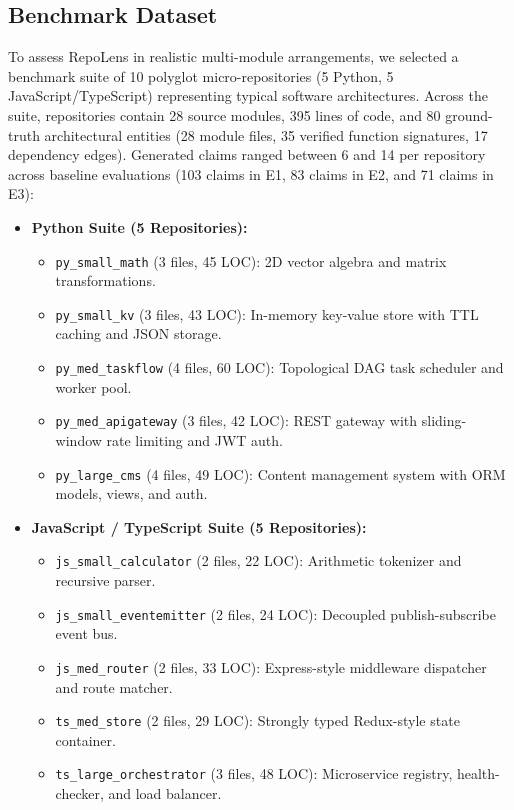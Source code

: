 \documentclass[conference]{IEEEtran}
\begin{document}
\subsection{Benchmark Dataset}
To assess RepoLens in realistic multi-module arrangements, we selected a benchmark suite of 10 polyglot micro-repositories (5 Python, 5 JavaScript/TypeScript) representing typical software architectures. Across the suite, repositories contain 28 source modules, 395 lines of code, and 80 ground-truth architectural entities (28 module files, 35 verified function signatures, 17 dependency edges). Generated claims ranged between 6 and 14 per repository across baseline evaluations (103 claims in E1, 83 claims in E2, and 71 claims in E3):
\begin{itemize}
    \item \textbf{Python Suite (5 Repositories):}
    \begin{itemize}
        \item \texttt{py\_small\_math} (3 files, 45 LOC): 2D vector algebra and matrix transformations.
        \item \texttt{py\_small\_kv} (3 files, 43 LOC): In-memory key-value store with TTL caching and JSON storage.
        \item \texttt{py\_med\_taskflow} (4 files, 60 LOC): Topological DAG task scheduler and worker pool.
        \item \texttt{py\_med\_apigateway} (3 files, 42 LOC): REST gateway with sliding-window rate limiting and JWT auth.
        \item \texttt{py\_large\_cms} (4 files, 49 LOC): Content management system with ORM models, views, and auth.
    \end{itemize}
    \item \textbf{JavaScript / TypeScript Suite (5 Repositories):}
    \begin{itemize}
        \item \texttt{js\_small\_calculator} (2 files, 22 LOC): Arithmetic tokenizer and recursive parser.
        \item \texttt{js\_small\_eventemitter} (2 files, 24 LOC): Decoupled publish-subscribe event bus.
        \item \texttt{js\_med\_router} (2 files, 33 LOC): Express-style middleware dispatcher and route matcher.
        \item \texttt{ts\_med\_store} (2 files, 29 LOC): Strongly typed Redux-style state container.
        \item \texttt{ts\_large\_orchestrator} (3 files, 48 LOC): Microservice registry, health-checker, and load balancer.
    \end{itemize}
\end{itemize}
\end{document}
